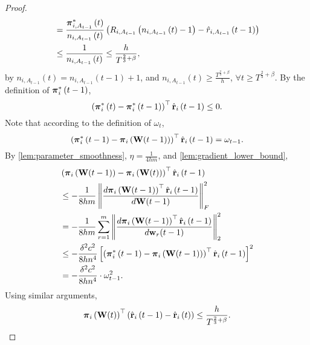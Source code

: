 \begin{proof}
\begin{equation*}
\begin{split}
    &= \frac{{{\boldsymbol{\pi}}_{i, A_{t-1}}^*\left(t\right)}}{n_{i, A_{t-1}}\left(t\right)} \left( R_{i, A_{t-1}}\left( n_{i, A_{t-1}}\left(t\right) -1 \right) - \hat{r}_{i, A_{t-1}}\left(t-1\right) \right) \\
    &\le \frac{1}{n_{i, A_{t-1}}\left(t\right)} \le \frac{h}{T^{\frac{2}{3} + \beta}},
\end{split}
\end{equation*}
by $n_{i, A_{t-1}}\left(t\right) = n_{i, A_{t-1}}\left(t-1\right) + 1$, and $n_{i, A_{t-1}}\left(t\right) \ge \frac{T^{\frac{2}{3} + \beta}}{h}$, $\forall t \ge T^{\frac{2}{3} + \beta}$. By the definition of ${{\boldsymbol{\pi}}_i^*\left(t-1\right)}$,
\begin{equation*}
    \left( {{\boldsymbol{\pi}}_i^*\left(t\right)} - {{\boldsymbol{\pi}}_i^*\left(t-1\right)} \right)^\top \hat{{\mathbf{r}}}_i\left(t-1\right) \le 0.
\end{equation*}
Note that according to the definition of $\omega_t$,
\begin{equation*}
    \left( {{\boldsymbol{\pi}}_i^*\left(t-1\right)} - {\boldsymbol{\pi}}_i\left( {\mathbf{W}}(t-1) \right) \right)^\top \hat{{\mathbf{r}}}_i\left(t-1\right) = \omega_{t-1}.
\end{equation*}
By \cref{lem:parameter_smoothness}, $\eta = \frac{1}{4hm}$, and \cref{lem:gradient_lower_bound},
\begin{equation*}
\begin{split}
    &\left(  {\boldsymbol{\pi}}_i\left( {\mathbf{W}}(t-1) \right) - {\boldsymbol{\pi}}_i\left( {\mathbf{W}}(t) \right) 
    \right)^\top \hat{{\mathbf{r}}}_i\left(t-1\right) \\
    &\le - \frac{1}{8 h m} \left\| \frac{d {\boldsymbol{\pi}}_i\left( {\mathbf{W}}(t-1) \right)^\top \hat{{\mathbf{r}}}_i\left(t-1\right)}{d {\mathbf{W}}(t-1)} \right\|_F^2 \\
    &= - \frac{1}{8 h m} \sum\limits_{r=1}^{m}{ \left\| \frac{d {\boldsymbol{\pi}}_i\left( {\mathbf{W}}(t-1) \right)^\top \hat{{\mathbf{r}}}_i\left(t-1\right)}{d {\mathbf{w}}_r(t-1)} \right\|_2^2 } \\
    &\le - \frac{\delta^2 c^2}{8 h n^4} \left[ \left( {{\boldsymbol{\pi}}_i^*\left(t-1\right)} - {\boldsymbol{\pi}}_i\left( {\mathbf{W}}(t-1) \right) \right)^\top \hat{{\mathbf{r}}}_i\left(t-1\right)  \right]^2 \\
    &= - \frac{\delta^2 c^2}{8 h n^4} \cdot \omega_{t-1}^2.
\end{split}
\end{equation*}
Using similar arguments,
\begin{equation*}
    {\boldsymbol{\pi}}_i\left( {\mathbf{W}}(t) \right)^\top \left( \hat{{\mathbf{r}}}_i\left(t-1\right) - \hat{{\mathbf{r}}}_i\left(t\right)  \right) \le \frac{h}{T^{\frac{2}{3} + \beta}}.
\end{equation*}

\end{proof}
